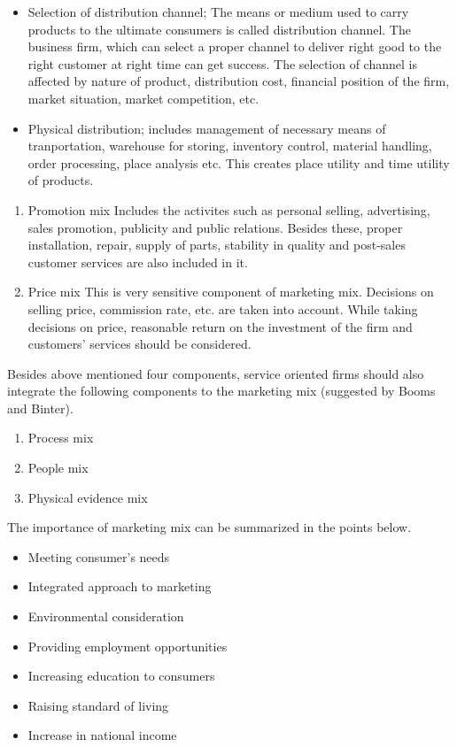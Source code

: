 \documentclass[11pt,]{book}
\providecommand{\tightlist}{%
  \setlength{\itemsep}{0pt}\setlength{\parskip}{0pt}}
\theoremstyle{definition}
\theoremstyle{definition}
\theoremstyle{definition}
\theoremstyle{remark}
\begin{document}
\begin{itemize}
\tightlist
\item
  Selection of distribution channel; The means or medium used to carry
  products to the ultimate consumers is called distribution channel. The
  business firm, which can select a proper channel to deliver right good
  to the right customer at right time can get success. The selection of
  channel is affected by nature of product, distribution cost, financial
  position of the firm, market situation, market competition, etc.
\item
  Physical distribution; includes management of necessary means of
  tranportation, warehouse for storing, inventory control, material
  handling, order processing, place analysis etc. This creates place
  utility and time utility of products.
\end{itemize}

\begin{enumerate}
\def\labelenumi{\arabic{enumi}.}
\setcounter{enumi}{2}
\item
  Promotion mix \newline Includes the activites such as personal
  selling, advertising, sales promotion, publicity and public relations.
  Besides these, proper installation, repair, supply of parts, stability
  in quality and post-sales customer services are also included in it.
\item
  Price mix \newline This is very sensitive component of marketing mix.
  Decisions on selling price, commission rate, etc. are taken into
  account. While taking decisions on price, reasonable return on the
  investment of the firm and customers' services should be considered.
\end{enumerate}

Besides above mentioned four components, service oriented firms should
also integrate the following components to the marketing mix (suggested
by Booms and Binter).

\begin{enumerate}
\def\labelenumi{\arabic{enumi}.}
\setcounter{enumi}{4}
\tightlist
\item
  Process mix
\item
  People mix
\item
  Physical evidence mix
\end{enumerate}

The importance of marketing mix can be summarized in the points below.

\begin{itemize}
\tightlist
\item
  Meeting consumer's needs
\item
  Integrated approach to marketing
\item
  Environmental consideration
\item
  Providing employment opportunities
\item
  Increasing education to consumers
\item
  Raising standard of living
\item
  Increase in national income
\end{itemize}
\end{document}
